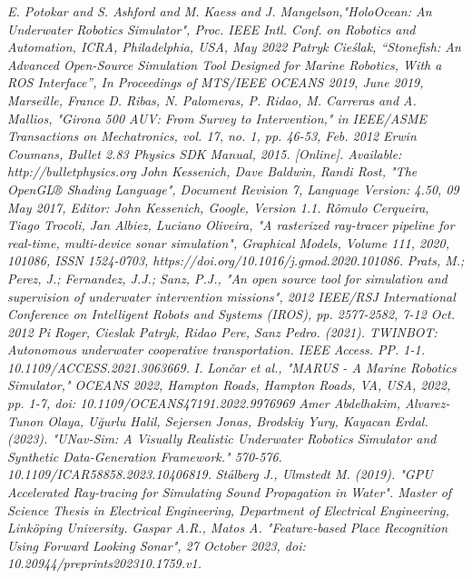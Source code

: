 \documentclass[]{article}
\begin{document}
	\begin{thebibliography}{2}
	
	\bibitem[1]{} \textit{E. Potokar and S. Ashford and M. Kaess and J. Mangelson,"HoloOcean: An Underwater Robotics Simulator", Proc. IEEE Intl. Conf. on Robotics and Automation, ICRA, Philadelphia, USA, May 2022}
	\bibitem[2]{} \textit{Patryk Cieślak, “Stonefish: An Advanced Open-Source Simulation Tool Designed for Marine Robotics, With a ROS Interface”, In Proceedings of MTS/IEEE OCEANS 2019, June 2019, Marseille, France}
	\bibitem[3]{} \textit {D. Ribas, N. Palomeras, P. Ridao, M. Carreras and A. Mallios, "Girona 500 AUV: From Survey to Intervention," in IEEE/ASME Transactions on Mechatronics, vol. 17, no. 1, pp. 46-53, Feb. 2012}
	\bibitem[4]{} \textit{Erwin Coumans, Bullet 2.83 Physics SDK Manual, 2015. [Online]. Available: http://bulletphysics.org}
	\bibitem[5]{} \textit{John Kessenich, Dave Baldwin, Randi Rost, "The OpenGL® Shading Language", Document Revision 7, Language Version: 4.50, 09 May 2017, Editor: John Kessenich, Google, Version 1.1.}
	\bibitem[6]{} \textit{Rômulo Cerqueira, Tiago Trocoli, Jan Albiez, Luciano Oliveira, "A rasterized ray-tracer pipeline for real-time, multi-device sonar simulation", Graphical Models, Volume 111, 2020, 101086, ISSN 1524-0703, https://doi.org/10.1016/j.gmod.2020.101086.}
	\bibitem[7]{} \textit{Prats, M.; Perez, J.; Fernandez, J.J.; Sanz, P.J., "An open source tool for simulation and supervision of underwater intervention missions", 2012 IEEE/RSJ International Conference on Intelligent Robots and Systems (IROS), pp. 2577-2582, 7-12 Oct. 2012}
	\bibitem[8]{} \textit{Pi Roger, Cieslak Patryk,  Ridao Pere, Sanz Pedro. (2021). TWINBOT: Autonomous underwater cooperative transportation. IEEE Access. PP. 1-1. 10.1109/ACCESS.2021.3063669. }
	\bibitem[9]{} \textit{I. Lončar et al., "MARUS - A Marine Robotics Simulator," OCEANS 2022, Hampton Roads, Hampton Roads, VA, USA, 2022, pp. 1-7, doi: 10.1109/OCEANS47191.2022.9976969}
	\bibitem[10]{} \textit{Amer Abdelhakim,  Alvarez-Tunon Olaya,  Uğurlu Halil, Sejersen Jonas, Brodskiy Yury, Kayacan Erdal. (2023). "UNav-Sim: A Visually Realistic Underwater Robotics Simulator and Synthetic Data-Generation Framework." 570-576. 10.1109/ICAR58858.2023.10406819. }
	\bibitem[11]{} \textit{Stålberg J., Ulmstedt M. (2019). "GPU Accelerated Ray-tracing for Simulating Sound Propagation in Water". Master of Science Thesis in Electrical Engineering, Department of Electrical Engineering, Linköping University.}
	\bibitem[12]{} \textit{Gaspar A.R., Matos A. "Feature-based Place Recognition Using Forward Looking Sonar", 27 October 2023, doi: 10.20944/preprints202310.1759.v1.}

\end{thebibliography}
\end{document}

